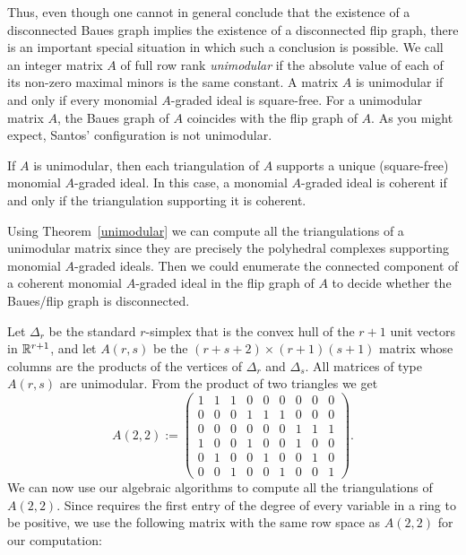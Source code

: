 Thus, even though one cannot in general conclude that the existence of
a disconnected Baues graph implies the existence of a disconnected
flip graph, there is an important special situation in which such a
conclusion is possible. We call an integer matrix $A$ of full row rank
{\em unimodular} if the absolute value of each of its non-zero maximal
minors is the same constant. A matrix $A$ is unimodular if and only if
every monomial $A$-graded ideal is square-free. For a unimodular
matrix $A$, the Baues graph of $A$ coincides with the flip graph of
$A$. As you might expect, Santos' configuration is not unimodular.

\begin{theorem}\label{unimodular}
If $A$ is unimodular, then each triangulation of $A$ supports a unique
(square-free) monomial $A$-graded ideal. In this case, a monomial
$A$-graded ideal is coherent if and only if the triangulation
supporting it is coherent.
\end{theorem}

Using Theorem~\ref{unimodular} we can compute all the triangulations
of a unimodular matrix since they are precisely the polyhedral
complexes supporting monomial $A$-graded ideals. Then we could
enumerate the connected component of a coherent monomial $A$-graded
ideal in the flip graph of $A$ to decide whether the Baues/flip graph
is disconnected.

Let $\Delta_r$ be the standard $r$-simplex that 
is the convex hull of the $r+1$ unit vectors in $\mathbb{R}^{r+1}$, and let 
$A(r,s)$ be the $(r+s+2) \times (r+1)(s+1)$ matrix whose columns 
are the products of the vertices of $\Delta_r$ and $\Delta_s$. All 
matrices of type $A(r,s)$ are unimodular. From the
product of two triangles we get $$A(2,2) := 
\left ( \begin{array}{ccccccccc}
1&1&1&0&0&0&0&0&0\\
0&0&0&1&1&1&0&0&0\\
0&0&0&0&0&0&1&1&1\\
1&0&0&1&0&0&1&0&0\\
0&1&0&0&1&0&0&1&0\\
0&0&1&0&0&1&0&0&1 \end{array} \right ).$$
We can now use our algebraic algorithms to compute all
the triangulations of $A(2,2)$. Since \Mtwo requires the first entry 
of the degree of every variable in a ring to be positive, we use 
the following matrix with the same row space as $A(2,2)$ for our 
computation:

